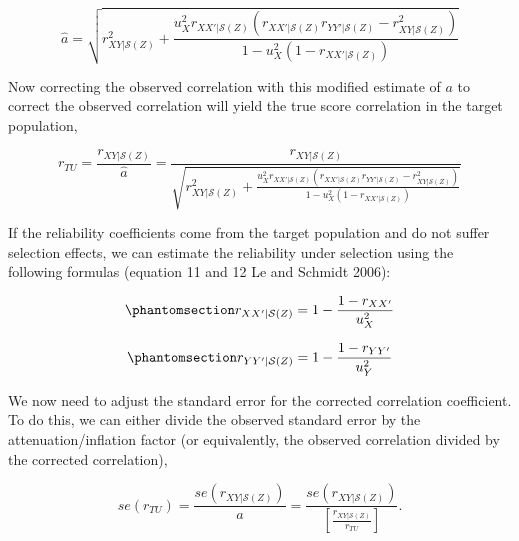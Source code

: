 \documentclass[
  letterpaper,
  DIV=11,
  numbers=noendperiod]{scrreprt}
\begin{document}
\[
\hat{a} = \sqrt{r_{XY|\mathcal{S}(Z)}^2 + \frac{u_{X}^2 r_{XX'|\mathcal{S}(Z)}\left(r_{XX'|\mathcal{S}(Z)}r_{YY'|\mathcal{S}(Z)} - r_{XY|\mathcal{S}(Z)}^2\right) }{1 - u_{X}^2 \left(1-r_{XX'|\mathcal{S}(Z)}\right)} }
\]

Now correcting the observed correlation with this modified estimate of
\(a\) to correct the observed correlation will yield the true score
correlation in the target population,

\[
r_{TU}=\frac{r_{XY|\mathcal{S}(Z)}}{\hat{a}} = \frac{r_{XY|\mathcal{S}(Z)}}{\sqrt{r_{XY|\mathcal{S}(Z)}^2 + \frac{u_{X}^2 r_{XX'|\mathcal{S}(Z)}\left(r_{XX'|\mathcal{S}(Z)}r_{YY'|\mathcal{S}(Z)} - r_{XY|\mathcal{S}(Z)}^2\right) }{1 - u_{X}^2 \left(1-r_{XX'|\mathcal{S}(Z)}\right)} }}
\]

If the reliability coefficients come from the target population and do
not suffer selection effects, we can estimate the reliability under
selection using the following formulas (equation 11 and 12 Le and
Schmidt 2006):

\begin{equation}\phantomsection\label{eq-rel-x}{
r_{XX'|\mathcal{S}(Z)} = 1-\frac{1-r_{XX'}}{u_X^2}
}\end{equation}

\begin{equation}\phantomsection\label{eq-rel-y}{
r_{YY'|\mathcal{S}(Z)} = 1-\frac{1-r_{YY'}}{u_Y^2}
}\end{equation}

We now need to adjust the standard error for the corrected correlation
coefficient. To do this, we can either divide the observed standard
error by the attenuation/inflation factor (or equivalently, the observed
correlation divided by the corrected correlation),

\[
se(r_{TU}) = \frac{se\left(r_{XY|\mathcal{S}(Z)}\right)}{\hat{a}}= \frac{se\left(r_{XY|\mathcal{S}(Z)}\right)}{\left[\frac{r_{XY|\mathcal{S}(Z)}}{r_{TU}}\right]}.
\]
\end{document}
